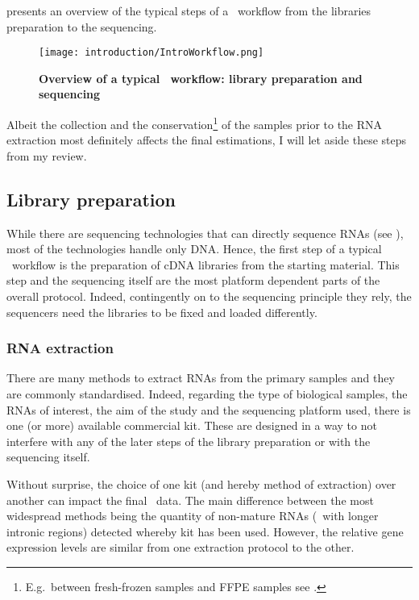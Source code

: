  presents an overview of the typical steps of a
\Rnaseq\ workflow from the libraries preparation to the sequencing.

\begin{figure}
    \texttt{[image: introduction/IntroWorkflow.png]}\centering
    \caption[Overview of a \Rnaseq\ workflow: library preparation
    and sequencing]{\label{fig:OverviewRnaseqPrepSeq}\textbf{Overview of
    a typical \Rnaseq\ workflow:
    library preparation and sequencing}}
\end{figure}

\NB Albeit the collection and the conservation\footnote{E.g.\ between fresh-frozen
samples and \gls{FFPE} samples see \cite{sampleConservationMatters}.}
of the samples prior to the
\gls{RNA} extraction most definitely affects the final estimations,
I will let aside these steps from my review.

\subsection{Library preparation}

While there are sequencing technologies that can directly sequence \glspl{RNA}
(see ), most of the technologies handle only \gls{DNA}.
Hence, the first step of a typical \Rnaseq\ workflow is the preparation of
\gls{cDNA} libraries from the starting material. This step and the sequencing
itself are the most platform dependent parts of the overall protocol.
Indeed, contingently on to the sequencing principle they rely,
the sequencers need the libraries to be fixed and loaded differently.

\subsubsection{\gls{RNA} extraction}

There are many methods to extract \glspl{RNA} from the primary samples and they
are commonly standardised. Indeed, regarding the type of biological samples,
the \glspl{RNA} of interest, the aim of the  study and the sequencing platform
used, there is one (or more) available commercial kit. These are designed in
a way to not interfere
with any of the later steps of the library preparation or with the sequencing
itself.

Without surprise, the choice of one kit (and hereby method of extraction)
over another can impact the final \Rnaseq\ data. The main difference between
the most widespread methods being the quantity of non-mature \glspl{RNA}
(\ie\ with longer intronic regions) detected whereby kit has been used.
However, the relative gene expression levels are similar from one extraction
protocol to the other. 


